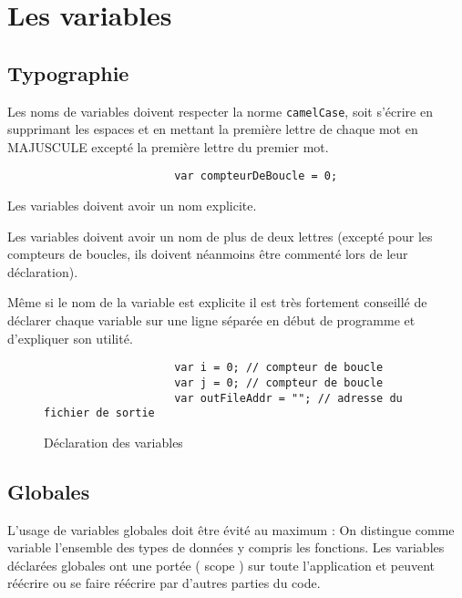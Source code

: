 	\section{Les variables}
		\subsection{Typographie}
			Les noms de variables doivent respecter la norme \verb+camelCase+, soit s'écrire en supprimant les espaces et en mettant la première lettre de chaque mot en MAJUSCULE excepté la première lettre du premier mot.

			\begin{figure}[H]
				\begin{changemargin}{-2.5cm}{-2.5cm}
				\begin{tcolorbox}
				\begin{verbatim}
					var compteurDeBoucle = 0;
				\end{verbatim}
				\end{tcolorbox}
				\end{changemargin}
			\end{figure}

			Les variables doivent avoir un nom explicite.

			Les variables doivent avoir un nom de plus de deux lettres (excepté pour les compteurs de boucles, ils doivent néanmoins être commenté lors de leur déclaration).

			Même si le nom de la variable est explicite il est très fortement conseillé de déclarer chaque variable sur une ligne séparée en début de programme et d'expliquer son utilité.

			\begin{figure}[H]
				\begin{changemargin}{-2.5cm}{-2.5cm}
				\begin{tcolorbox}
				\begin{verbatim}
					var i = 0; // compteur de boucle
					var j = 0; // compteur de boucle
					var outFileAddr = ""; // adresse du fichier de sortie
				\end{verbatim}
				\end{tcolorbox}
				\end{changemargin}
				\caption{Déclaration des variables}
			\end{figure}
			
		\subsection{Globales}
			L'usage de variables globales doit être évité au maximum : On distingue comme variable l'ensemble des types de données y compris les fonctions. Les variables déclarées globales ont une portée ( scope ) sur toute l'application et peuvent réécrire ou se faire réécrire par d'autres parties du code.

